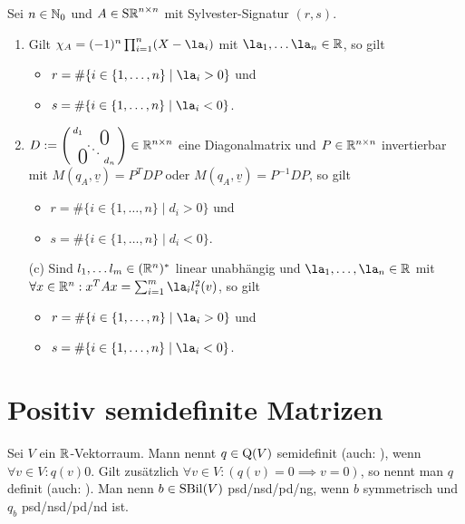 \documentclass[../../main.tex]{subfiles}
\begin{document}
\begin{kor}\label{14.1.5}
Sei $n\in \mathbb N_0$ und $A\in \operatorname{S\mathbb R}^{n\times n}$ mit Sylvester-Signatur $(r,s)$.
\begin{enumerate}[\normalfont(a)]
\item Gilt $\chi_A=(-1)^n\prod_{i=1}^n(X-\la_i)$ mit $\la_1,\ldots \la_n\in \R$, so gilt
\begin{itemize}
\item $r=\#\{i\in \{1,\ldots ,n\}\mid \la_i>0\}$ und
\item $s=\#\{i\in \{1,\ldots ,n\}\mid \la_i<0\}$.
\end{itemize}
		
\item $D:=\left(\begin{smallmatrix}
d_1 & & \llap{$\overset{\blap{\LARGE 0}}{~}$} \\
& \ddots &\\
\rlap{\tlap{\LARGE 0}} & & d_n\end{smallmatrix}\right)\in \R^{n\times n}$ eine Diagonalmatrix und $P\in \mathbb R^{n\times n}$ invertierbar mit $M(q_A,\underline{v})=P^TDP$ oder $M(q_A,\underline{v})=P^{-1}DP$, so gilt
\begin{itemize}
\item $r=\#\{i\in \{1,\ldots ,n\}\mid d_i>0\}$ und
\item $s=\#\{i\in \{1,\ldots ,n\}\mid d_i<0\}$.
\end{itemize}
		
\item[(c)] Sind $l_1,\ldots l_m\in (\mathbb R^n)^*$ linear unabhängig und $\la_1,\ldots ,\la_n\in \R$ mit $\forall x\in \R^n: x^TAx=\sum_{i=1}^m\la_il_i^2(v)$, so gilt
\begin{itemize}
\item $r=\#\{i\in \{1,\ldots ,n\}\mid \la_i>0\}$ und
\item $s=\#\{i\in \{1,\ldots ,n\}\mid \la_i<0\}$.
\end{itemize}
\end{enumerate}
\end{kor}

\section{Positiv semidefinite Matrizen}

\begin{df}\label{14.2.1}
Sei $V$ ein $\mathbb R$-Vektorraum. Mann nennt $q\in\operatorname{Q}(V)$  semidefinit (auch: ), wenn $\forall v\in V: q(v)$\case{$\ge$}{$\le$}$0$. Gilt zusätzlich $\forall v\in V: (q(v)=0\implies v=0)$, so nennt man $q$  definit (auch: ). Man nenn $b\in \operatorname{SBil}(V)$ psd/nsd/pd/ng, wenn $b$ symmetrisch und $q_b$ psd/nsd/pd/nd ist.
\end{df}
\end{document}
